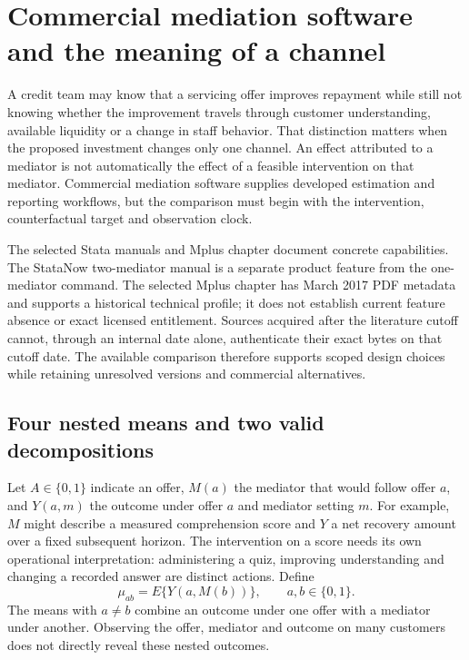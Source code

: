 \section{Commercial mediation software and the meaning of a channel}
\label{exec20:med-scope}
A credit team may know that a servicing offer improves repayment while still not knowing whether the improvement travels through customer understanding, available liquidity or a change in staff behavior. That distinction matters when the proposed investment changes only one channel. An effect attributed to a mediator is not automatically the effect of a feasible intervention on that mediator. Commercial mediation software supplies developed estimation and reporting workflows, but the comparison must begin with the intervention, counterfactual target and observation clock.

The selected Stata manuals and Mplus chapter document concrete capabilities. The StataNow two-mediator manual is a separate product feature from the one-mediator command. The selected Mplus chapter has March 2017 PDF metadata and supports a historical technical profile; it does not establish current feature absence or exact licensed entitlement. Sources acquired after the literature cutoff cannot, through an internal date alone, authenticate their exact bytes on that cutoff date. The available comparison therefore supports scoped design choices while retaining unresolved versions and commercial alternatives.\citep{exec20_med_stata_one,exec20_med_stata_multiple,exec20_med_mplus_ch17}

\subsection{Four nested means and two valid decompositions}
\label{exec20:med-targets}
Let $A\in\{0,1\}$ indicate an offer, $M(a)$ the mediator that would follow offer $a$, and $Y(a,m)$ the outcome under offer $a$ and mediator setting $m$. For example, $M$ might describe a measured comprehension score and $Y$ a net recovery amount over a fixed subsequent horizon. The intervention on a score needs its own operational interpretation: administering a quiz, improving understanding and changing a recorded answer are distinct actions. Define
\begin{equation}
 \mu_{ab}=E\{Y(a,M(b))\},\qquad a,b\in\{0,1\}.
 \label{exec20:med-means}
\end{equation}
The means with $a\ne b$ combine an outcome under one offer with a mediator under another. Observing the offer, mediator and outcome on many customers does not directly reveal these nested outcomes.

